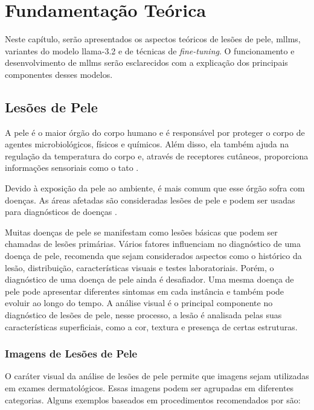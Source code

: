 \section{Fundamentação Teórica}

Neste capítulo, serão apresentados os aspectos teóricos de lesões de pele, \acp{mllm}, variantes do modelo
\ac{llama}-3.2 e de técnicas de \textit{fine-tuning}. O funcionamento e desenvolvimento de \acp{mllm} serão
esclarecidos com a explicação dos principais componentes desses modelos.

\subsection{Lesões de Pele}

A pele é o maior órgão do corpo humano e é responsável por proteger o corpo de agentes microbiológicos, físicos e
químicos. Além disso, ela também ajuda na regulação da temperatura do corpo e, através de receptores cutâneos,
proporciona informações sensoriais como o tato \cite{skin}.

Devido à exposição da pele ao ambiente, é mais comum que esse órgão sofra com doenças. As áreas afetadas são
consideradas lesões de pele e podem ser usadas para diagnósticos de doenças \cite{segmentation_skin_lesions}.

Muitas doenças de pele se manifestam como lesões básicas que podem ser chamadas de lesões primárias. Vários fatores
influenciam no diagnóstico de uma doença de pele, \textcite{habif2015clinical} recomenda que sejam considerados
aspectos como o histórico da lesão, distribuição, características visuais e testes laboratoriais. Porém, o diagnóstico
de uma doença de pele ainda é desafiador. Uma mesma doença de pele pode apresentar diferentes sintomas em cada
instância e também pode evoluir ao longo do tempo. A análise visual é o principal componente no diagnóstico de lesões
de pele, nesse processo, a lesão é analisada pelas suas características superficiais, como a cor, textura e presença de
certas estruturas.

\subsubsection{Imagens de Lesões de Pele} \label{sec:skin_lesion_images}

O caráter visual da análise de lesões de pele permite que imagens sejam utilizadas em exames dermatológicos. Essas
imagens podem ser agrupadas em diferentes categorias. Alguns exemplos baseados em procedimentos recomendados por
\textcite{fotos_dermatologia} são:


